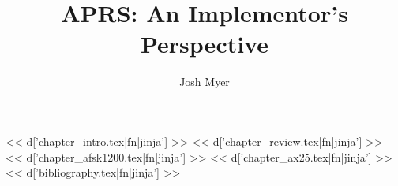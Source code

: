 \documentclass{book}
\title{APRS: An Implementor's Perspective}
\author{Josh Myer}
\begin{document}
\newcommand{\aprs}{APRS\texttrademark}

\maketitle


% 
<< d['chapter_intro.tex|fn|jinja'] >>
%
<< d['chapter_review.tex|fn|jinja'] >>
% 
<< d['chapter_afsk1200.tex|fn|jinja'] >>
%
<< d['chapter_ax25.tex|fn|jinja'] >>
% 
<< d['bibliography.tex|fn|jinja'] >>
\end{document}
